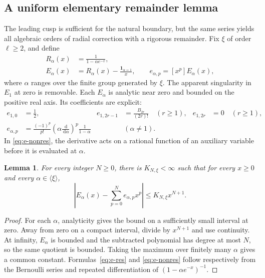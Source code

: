 \documentclass[11pt,a4paper]{article}
\numberwithin{equation}{section}
\newtheorem{lemma}[theorem]{Lemma}
\theoremstyle{definition}
\theoremstyle{remark}
\newcommand{\dd}{\,\mathrm d}
\begin{document}
\subsection{A uniform elementary remainder lemma}
The leading cusp is sufficient for the natural boundary, but the same series yields all algebraic orders of radial correction with a rigorous remainder. Fix \(\xi\) of order \(\ell\ge2\), and define
\begin{align}
 R_\alpha(x)&=\frac1{1-\alpha e^{-x}},\nonumber\\
 E_\alpha(x)&=R_\alpha(x)-\frac{\mathbf1_{\alpha=1}}x,
 \qquad e_{\alpha,p}=[x^p]E_\alpha(x),\label{eq:E-alpha}
\end{align}
where \(\alpha\) ranges over the finite group generated by \(\xi\). The apparent singularity in \(E_1\) at zero is removable. Each \(E_\alpha\) is analytic near zero and bounded on the positive real axis. Its coefficients are explicit:
\begin{align}
 e_{1,0}&=\frac12,
 & e_{1,2r-1}&=\frac{B_{2r}}{(2r)!}\quad(r\ge1),
 &e_{1,2r}&=0\quad(r\ge1),\label{eq:e-res}\\
 e_{\alpha,p}&=\frac{(-1)^p}{p!}
  \left(\alpha\frac{\dd}{\dd\alpha}\right)^p\frac1{1-\alpha}
 &&(\alpha\ne1).\label{eq:e-nonres}
\end{align}
In \eqref{eq:e-nonres}, the derivative acts on a rational function of an auxiliary variable before it is evaluated at \(\alpha\).

\begin{lemma}\label{lem:global-taylor}
For every integer \(N\ge0\), there is \(K_{N,\xi}<\infty\) such that for every \(x\ge0\) and every \(\alpha\in\langle\xi\rangle\),
\begin{equation}\label{eq:global-rem}
 \left|E_\alpha(x)-\sum_{p=0}^N e_{\alpha,p}x^p\right|
 \le K_{N,\xi}x^{N+1}.
\end{equation}
\end{lemma}
\begin{proof}
For each \(\alpha\), analyticity gives the bound on a sufficiently small interval at zero. Away from zero on a compact interval, divide by \(x^{N+1}\) and use continuity. At infinity, \(E_\alpha\) is bounded and the subtracted polynomial has degree at most \(N\), so the same quotient is bounded. Taking the maximum over finitely many \(\alpha\) gives a common constant. Formulas~\eqref{eq:e-res} and \eqref{eq:e-nonres} follow respectively from the Bernoulli series and repeated differentiation of \((1-\alpha e^{-x})^{-1}\).
\end{proof}
\end{document}
